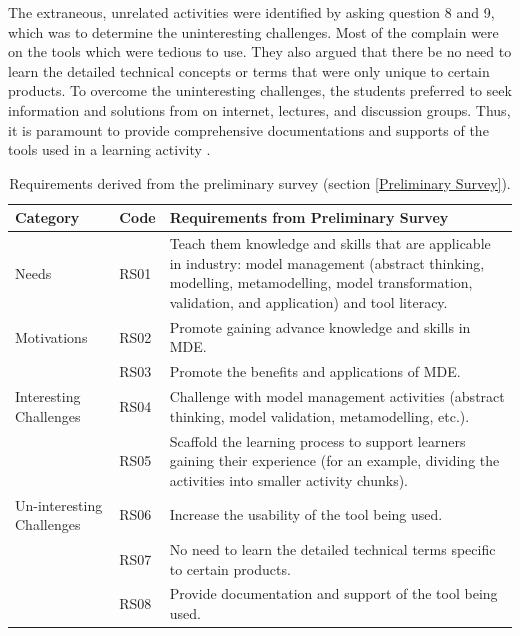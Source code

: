 \documentclass[12pt, a4paper]{report}
\begin{document}
The extraneous, unrelated activities were identified by asking question 8 and 9, which was to determine the uninteresting challenges. Most of the complain were on the tools which were tedious to use. They also argued that there be no need to learn the detailed technical concepts or terms that were only unique to certain products. To overcome the uninteresting challenges, the students preferred to seek information and solutions from on internet, lectures, and discussion groups. Thus, it is paramount to provide comprehensive documentations and supports of the tools used in a learning activity \cite{liebel2015ready}. 

\begin{table}[ht]
\caption{Requirements derived from the preliminary survey (section \ref{Preliminary Survey}).}
\label{table:preliminary-survey}
\begin{center}
\begin{tabular}{ p{2cm}p{1cm}p{10cm} } 
\hline
Category & Code & Requirements from Preliminary Survey \\
\hline
\multirow{1}{2cm}{Needs} 
& RS01 & Teach them knowledge and skills that are applicable in industry: model management (abstract thinking, modelling, metamodelling, model transformation, validation, and application) and tool literacy. \\ 
\hline
\multirow{1}{2cm}{Motivations}
& RS02 & Promote gaining advance knowledge and skills in MDE. \\ 
& RS03 & Promote the benefits and applications of MDE. \\ 
\hline
\multirow{1}{2cm}{Interesting Challenges}
& RS04 & Challenge with model management activities (abstract thinking, model validation, metamodelling, etc.). \\ 
& RS05 & Scaffold the learning process to support learners gaining their experience (for an example, dividing the activities into smaller activity chunks). \\ 
\hline
\multirow{1}{2cm}{Un-interesting Challenges}
& RS06 & Increase the usability of the tool being used. \\ 
& RS07 & No need to learn the detailed technical terms specific to certain products. \\ 
& RS08 & Provide documentation and support of the tool being used. \\ 
\hline
\end{tabular}
\end{center}
\end{table}
\end{document}
